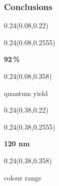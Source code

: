 \documentclass[aspectratio=169]{beamer}
\begin{document}
\begin{frame}[t]
  \frametitle{Conclusions}

%
\begin{textblock}{0.24}(0.08,0.22)
\end{textblock}

\begin{textblock}{0.24}(0.08,0.2555)
{\centering\fontsize{30}{36}\selectfont \textcolor[HTML]{FFFFFF}{\textbf{92\,\%}}\par}
\end{textblock}

\begin{textblock}{0.24}(0.08,0.358)
{\centering\fontsize{12}{14}\selectfont \textcolor[HTML]{FFFFFF}{quantum yield}\par}
\end{textblock}

%
\begin{textblock}{0.24}(0.38,0.22)
\end{textblock}

\begin{textblock}{0.24}(0.38,0.2555)
{\centering\fontsize{30}{36}\selectfont \textcolor[HTML]{FFFFFF}{\textbf{120 nm}}\par}
\end{textblock}

\begin{textblock}{0.24}(0.38,0.358)
{\centering\fontsize{12}{14}\selectfont \textcolor[HTML]{FFFFFF}{colour range}\par}
\end{textblock}


\end{frame}
\end{document}
